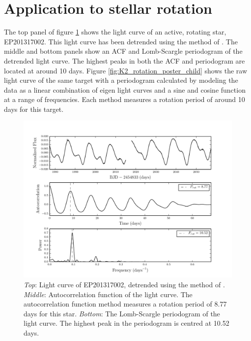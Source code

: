 \documentclass[useAMS, usenatbib]{aastex}
\begin{document}
\section{Application to stellar rotation}
The top panel of figure \ref{fig:rotation_poster_child} shows the light curve
of an active, rotating star, EP201317002.
This light curve has been detrended using the method of
\citet{Vanderburg2014}.
The middle and bottom panels show an ACF and Lomb-Scargle periodogram of the
detrended light curve.
The highest peaks in both the ACF and periodogram are located at around 10
days.
Figure \ref{fig:K2_rotation_poster_child} shows the raw light curve of the same
target with a periodogram calculated by modeling the data as a linear
combination of eigen light curves and a sine and cosine function at a range of
frequencies.
Each method measures a rotation period of around 10 days for this target.

\begin{figure}
\begin{center}
\includegraphics[width=6in, clip=true]{rotation_poster_child.pdf}
\caption{{\it Top}: Light curve of EP201317002, detrended using the method
of \citet{Vanderburg2014}. {\it Middle}: Autocorrelation function of the
light curve. The autocorrelation function method measures a rotation period of
8.77 days for this star. {\it Bottom}: The Lomb-Scargle periodogram of the
light curve. The highest peak in the periodogram is centred at 10.52 days.}
\label{fig:rotation_poster_child}
\end{center}
\end{figure}
\end{document}
